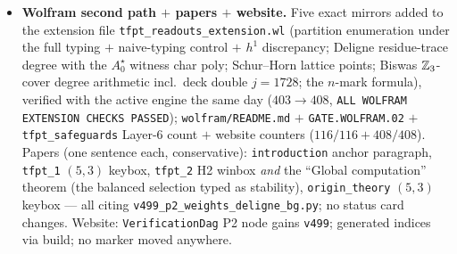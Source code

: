 \begin{itemize}[leftmargin=1.5em]
$y^3=(z{-}1)(z{-}i)(z{+}1)^2(z{+}i)^2$ (genus $2$; NOT the pillowcase double, genus $1$, $j=1728$ ---
the deck side); $p_*\mathcal O_Y=\mathcal O\oplus\mathcal O(-2)^2$; the regular-representation model
lands on $\{0,2,2\}$ $=$ the \emph{unstable} Schur--Horn companion ($h^0=1$): integrality and the sum
rule come \emph{out} of the correspondence, stability is the selector. \emph{Negative controls}: no
positivity $\to4$/$31$ solutions; $\deg-3/-5$ breaks; $n$-mark scan $e_2=(n{-}2)(n{+}1)/2=5$ ONLY at
$n=4$ (the value, not the uniqueness, is the $n{=}4$ content); MS-rational $e_2=\tfrac{16}3$,
$\tfrac{44}9$. \emph{Honest residuals} (P2 stays an axiom): R1 module identification \mC\
(\texttt{QGEO.SYM} territory), R2 (U) \mC\ (\texttt{v33}/\texttt{v40}), R3 analytic monodromy
(Numerical, \texttt{v117} check 4); non-circular (neither \texttt{v23}'s splitting input nor
\texttt{v115}'s $\operatorname{diag}A_0=a/4$ input used); the \texttt{v491} direction-reversal note
carries over. Ledger: new row \texttt{P2.TYPING.01}; the \texttt{v491}/\texttt{P2.PARTITION.01} row
records ``typing residual sharpened by \texttt{v499}'' (\texttt{v491} stays active, no supersede).
Registry $+$ \texttt{run\_all} (493 modules, suite green).
\item \textbf{Wolfram second path $+$ papers $+$ website.} Five exact mirrors added to the extension
file \texttt{tfpt\_readouts\_extension.wl} (partition enumeration under the full typing $+$ naive-typing
control $+$ $h^1$ discrepancy; Deligne residue-trace degree with the $A_0^\star$ witness char poly;
Schur--Horn lattice points; Biswas $\mathbb{Z}_3$-cover degree arithmetic incl.\ deck double $j=1728$; the
$n$-mark formula), verified with the active engine the same day ($403\to408$, \texttt{ALL WOLFRAM
EXTENSION CHECKS PASSED}); \texttt{wolfram/README.md} $+$ \texttt{GATE.WOLFRAM.02} $+$
\texttt{tfpt\_safeguards} Layer-6 count $+$ website counters ($116/116+408/408$). Papers (one sentence
each, conservative): \texttt{introduction} anchor paragraph, \texttt{tfpt\_1} $(5,3)$ keybox,
\texttt{tfpt\_2} H2 winbox \emph{and} the ``Global computation'' theorem (the balanced selection typed
as stability), \texttt{origin\_theory} $(5,3)$ keybox --- all citing
\texttt{v499\_p2\_weights\_deligne\_bg.py}; no status card changes. Website: \texttt{VerificationDag}
P2 node gains \texttt{v499}; generated indices via build; no marker moved anywhere.
\end{itemize}

